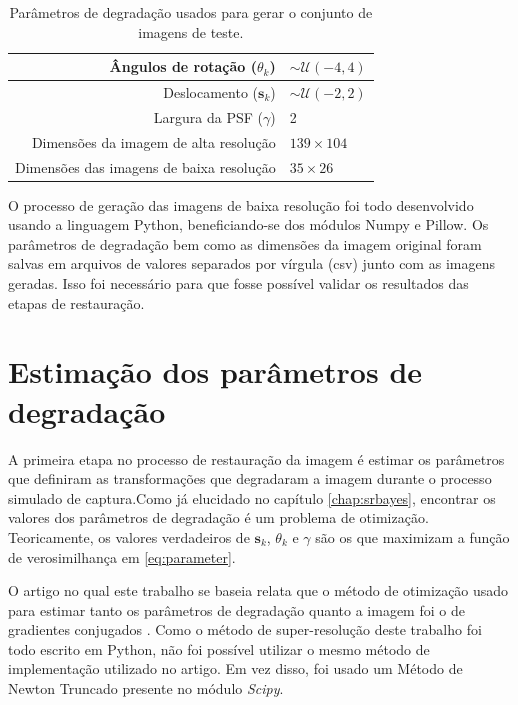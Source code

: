 \begin{table}[h]
	\centering
	\caption{Parâmetros de degradação usados para gerar o conjunto de imagens de teste.}
	\label{tab:resumoParametros}
	\begin{tabular}{r | l}
		Ângulos de rotação ($\theta_k$) & $ \sim \mathcal{U}(-4, 4)$ \\ \hline
		Deslocamento ($\mathbf{s}_k$)& $\sim \mathcal{U}(-2,2)$\\ \hline
		Largura da PSF ($\gamma$) & 2 \\ \hline
		Dimensões da imagem de alta resolução & $139 \times 104$ \\ \hline
		Dimensões das imagens de baixa resolução & $35 \times 26$ \\

	\end{tabular}
\end{table}

O processo de geração das imagens de baixa resolução foi todo desenvolvido usando a linguagem Python,
beneficiando-se dos módulos Numpy e Pillow.
Os parâmetros de degradação bem como as dimensões da imagem original foram salvas em arquivos de valores separados por vírgula (csv) junto com as imagens geradas.
Isso foi necessário para que fosse possível validar os resultados das etapas de restauração.

\section{Estimação dos parâmetros de degradação}
\label{sec:parestimation}
A primeira etapa no processo de restauração da imagem é estimar os parâmetros que definiram as transformações que degradaram a imagem durante o processo simulado de captura.Como já elucidado no capítulo \ref{chap:srbayes}, encontrar os valores dos parâmetros de degradação é um problema de otimização.
Teoricamente, os valores verdadeiros de $\mathbf{s}_k$, $\theta_k$ e $\gamma$ são os que maximizam a função de verosimilhança em \ref{eq:parameter}.

O artigo no qual este trabalho se baseia relata que o método de otimização usado
para estimar tanto os parâmetros de degradação quanto a imagem foi o de gradientes
conjugados \cite{tipping2003bayesian}.
Como o método de super-resolução deste trabalho foi todo escrito em Python,
não foi possível utilizar o mesmo método de implementação utilizado no artigo.
Em vez disso, foi usado um Método de Newton Truncado presente no módulo \emph{Scipy}.

